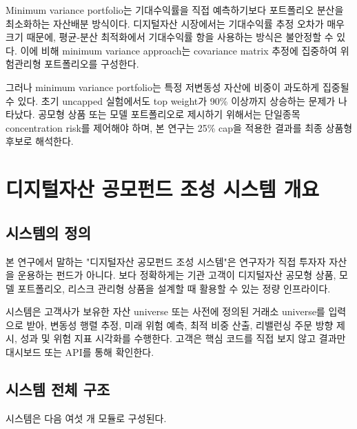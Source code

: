 \documentclass[12pt,a4paper]{article}
\begin{document}
Minimum variance portfolio는 기대수익률을 직접 예측하기보다 포트폴리오 분산을 최소화하는 자산배분 방식이다. 디지털자산 시장에서는 기대수익률 추정 오차가 매우 크기 때문에, 평균-분산 최적화에서 기대수익률 항을 사용하는 방식은 불안정할 수 있다. 이에 비해 minimum variance approach는 covariance matrix 추정에 집중하여 위험관리형 포트폴리오를 구성한다.

그러나 minimum variance portfolio는 특정 저변동성 자산에 비중이 과도하게 집중될 수 있다. 초기 uncapped 실험에서도 top weight가 90\% 이상까지 상승하는 문제가 나타났다. 공모형 상품 또는 모델 포트폴리오로 제시하기 위해서는 단일종목 concentration risk를 제어해야 하며, 본 연구는 25\% cap을 적용한 결과를 최종 상품형 후보로 해석한다.


\section{디지털자산 공모펀드 조성 시스템 개요}

\subsection{시스템의 정의}

본 연구에서 말하는 "디지털자산 공모펀드 조성 시스템"은 연구자가 직접 투자자 자산을 운용하는 펀드가 아니다. 보다 정확하게는 기관 고객이 디지털자산 공모형 상품, 모델 포트폴리오, 리스크 관리형 상품을 설계할 때 활용할 수 있는 정량 인프라이다.

시스템은 고객사가 보유한 자산 universe 또는 사전에 정의된 거래소 universe를 입력으로 받아, 변동성 행렬 추정, 미래 위험 예측, 최적 비중 산출, 리밸런싱 주문 방향 제시, 성과 및 위험 지표 시각화를 수행한다. 고객은 핵심 코드를 직접 보지 않고 결과만 대시보드 또는 API를 통해 확인한다.


\subsection{시스템 전체 구조}

시스템은 다음 여섯 개 모듈로 구성된다.
\end{document}
